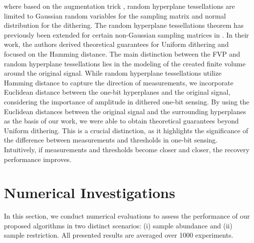 \documentclass[12pt,draftcls,onecolumn]{IEEEtran}
\begin{document}
where based on the augmentation trick \cite{baraniuk2017exponential,foucart2019recovering}, random hyperplane tessellations are limited to Gaussian random variables for the sampling matrix and normal distribution for the dithering.
The random hyperplane tessellations theorem has previously been %
extended for certain non-Gaussian sampling matrices in \cite{dirksen2022sharp,dirksen2021non}. In their work, the authors derived theoretical guarantees for Uniform dithering and focused on the Hamming distance.
The main distinction between the FVP and random hyperplane tessellations lies in the modeling of the created finite volume around the original signal. While random hyperplane tessellations utilize Hamming distance to capture the direction of measurements, we incorporate Euclidean distance between the one-bit hyperplanes and the original signal, considering the importance of amplitude in dithered one-bit sensing. 
By using the Euclidean distances between the original signal and the surrounding hyperplanes as the basis of our work, we were able to obtain theoretical guarantees beyond Uniform dithering. This is a crucial distinction, as it highlights the significance of the difference between measurements and thresholds in one-bit sensing. Intuitively, if measurements and thresholds become closer and closer, the recovery performance improves.

\section{Numerical Investigations}
In this section, we conduct numerical evaluations to assess the performance of our proposed algorithms in two distinct scenarios: (i) sample abundance and (ii) sample restriction. All presented results are averaged over 1000 experiments.
\end{document}
